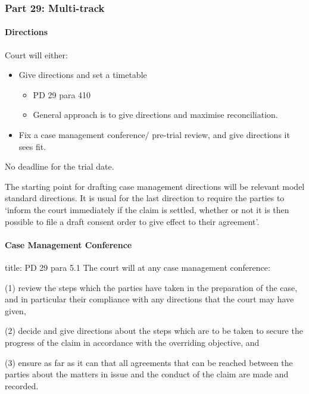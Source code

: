 \documentclass[
]{article}
\newenvironment{Shaded}{}{}
\newcommand{\NormalTok}[1]{#1}
\providecommand{\tightlist}{%
  \setlength{\itemsep}{0pt}\setlength{\parskip}{0pt}}
\begin{document}
\hypertarget{part-29-multi-track}{%
\subsubsection{Part 29: Multi-track}\label{part-29-multi-track}}

\hypertarget{directions}{%
\paragraph{Directions}\label{directions}}

Court will either:

\begin{itemize}
\tightlist
\item
  Give directions and set a timetable

  \begin{itemize}
  \tightlist
  \item
    PD 29 para 410
  \item
    General approach is to give directions and maximise reconciliation.
  \end{itemize}
\item
  Fix a case management conference/ pre-trial review, and give
  directions it sees fit.
\end{itemize}

No deadline for the trial date.

The starting point for drafting case management directions will be
relevant model standard directions. It is usual for the last direction
to require the parties to `inform the court immediately if the claim is
settled, whether or not it is then possible to file a draft consent
order to give effect to their agreement'.

\hypertarget{case-management-conference}{%
\paragraph{Case Management
Conference}\label{case-management-conference}}

\begin{Shaded}
\begin{Highlighting}[]
\NormalTok{title: PD 29 para 5.1}
\NormalTok{The court will at any case management conference:}

\NormalTok{(1) review the steps which the parties have taken in the preparation of the case, and in particular their compliance with any directions that the court may have given,}

\NormalTok{(2) decide and give directions about the steps which are to be taken to secure the progress of the claim in accordance with the overriding objective, and}

\NormalTok{(3) ensure as far as it can that all agreements that can be reached between the parties about the matters in issue and the conduct of the claim are made and recorded.}
\end{Highlighting}
\end{Shaded}
\end{document}
